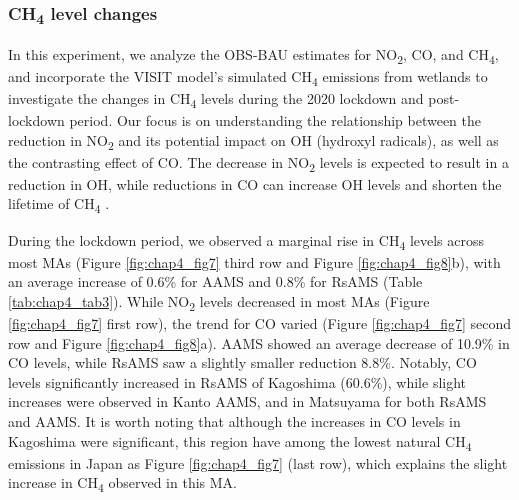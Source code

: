 \subsubsection{CH\textsubscript{4} level changes}
In this experiment, we analyze the OBS-BAU estimates for NO\textsubscript{2}, CO, and CH\textsubscript{4}, and incorporate the VISIT model's simulated CH\textsubscript{4} emissions from wetlands to investigate the changes in CH\textsubscript{4} levels during the 2020 lockdown and post-lockdown period. Our focus is on understanding the relationship between the reduction in NO\textsubscript{2} and its potential impact on OH (hydroxyl radicals), as well as the contrasting effect of CO. The decrease in NO\textsubscript{2} levels is expected to result in a reduction in OH, while reductions in CO can increase OH levels and shorten the lifetime of CH\textsubscript{4} \citep{akimoto2022rethinking}.\par
During the lockdown period, we observed a marginal rise in CH\textsubscript{4} levels across most MAs (Figure \ref{fig:chap4_fig7} third row and Figure \ref{fig:chap4_fig8}b), with an average increase of 0.6\% for AAMS and 0.8\% for RsAMS (Table \ref{tab:chap4_tab3}). While NO\textsubscript{2} levels decreased in most MAs (Figure \ref{fig:chap4_fig7} first row), the trend for CO varied (Figure \ref{fig:chap4_fig7} second row and Figure \ref{fig:chap4_fig8}a). AAMS showed an average decrease of 10.9\% in CO levels, while RsAMS saw a slightly smaller reduction 8.8\%. Notably, CO levels significantly increased in RsAMS of Kagoshima (60.6\%), while slight increases were observed in Kanto AAMS, and in Matsuyama for both RsAMS and AAMS. It is worth noting that although the increases in CO levels in Kagoshima were significant, this region have among the lowest natural CH\textsubscript{4} emissions in Japan as Figure \ref{fig:chap4_fig7} (last row), which explains the slight increase in CH\textsubscript{4} observed in this MA.\par



